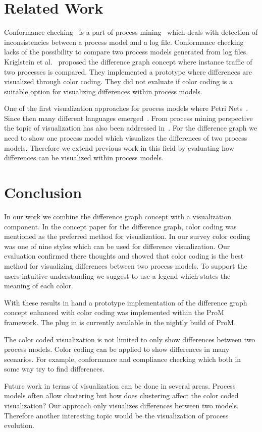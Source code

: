\documentclass{llncs}
\begin{document}
\section{Related Work}  %
\label{sec:RelatedWork}

Conformance checking~\cite{lit:ConformanceCheckingOfProcesses} is a part of process mining~\cite{lit:PMDiscoveryConformanceEnhancement,lit:BusinnessProcessMiningAnIndustrialAppliction} which deals with detection of inconsistencies between a process model and a log file. Conformance checking lacks of the possibility to compare two process models generated from log files. Kriglstein et al.~\cite{lit:VisuApprDiffAnalysis} proposed the difference graph concept where instance traffic of two processes is compared. They implemented a prototype where differences are visualized through color coding. They did not evaluate if color coding is a suitable option for visualizing differences within process models.

One of the first visualization approaches for process models where Petri Nets~\cite{lit:Petrinet}. Since then many different languages emerged~\cite{lit:UML,lit:EPC,lit:YAWL}. From process mining perspective the topic of visualization has also been addressed in~\cite{lit:ProMFramework}. For the difference graph we need to show one process model which visualizes the differences of two process models. Therefore we extend previous work in this field by evaluating how differences can be visualized within process models.

\section{Conclusion} %
\label{sec:Conclusion}
In our work we combine the difference graph concept with a visualization component. In the concept paper for the difference graph, color coding was mentioned as the preferred method for visualization. In our survey color coding was one of nine styles which can be used for difference visualization. Our evaluation confirmed there thoughts and showed that color coding is the best method for visualizing differences between two process models. To support the users intuitive understanding we suggest to use a legend which states the meaning of each color.

With these results in hand a prototype implementation of the difference graph concept enhanced with color coding was implemented within the ProM framework. The plug in is currently available in the nightly build of ProM.

The color coded visualization is not limited to only show differences between two process models. Color coding can be applied to show differences in many scenarios. For example, conformance and compliance checking which both in some way try to find differences.

Future work in terms of visualization can be done in several areas. Process models often allow clustering but how does clustering affect the color coded visualization? Our approach only visualizes differences between two models. Therefore another interesting topic would be the visualization of process evolution. 



\end{document}
